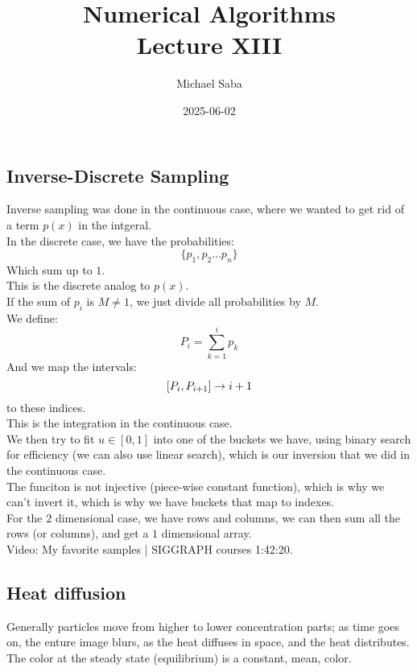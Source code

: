 \documentclass[12pt]{article}
\title{%
    \Huge Numerical Algorithms \\
    \Large Lecture XIII
}
\date{2025-06-02}
\author{Michael Saba}
\begin{document}
\maketitle
\newpage
\setlength{\parindent}{0pt}

\subsection*{Inverse-Discrete Sampling}

Inverse sampling was done in the continuous case,
where we wanted to get rid of a term $p(x)$
in the intgeral. \\

In the discrete case, we have the probabilities:
\[ \{p_1, p_2 \dots p_n \} \]
Which sum up to $1$. \\
This is the discrete analog to $p(x)$. \\

If the sum of $p_i$ is $M \neq 1$, we just divide
all probabilities by $M$. \\

We define:
\[ P_i = \sum_{k=1}^i p_k \]
And we map the intervals:
\[ \left[  P_i,  P_{i+1} \right] \to i+1 \]
to these indices. \\
This is the integration in the continuous case. \\

We then try to fit $u \in [0, 1]$ 
into one of the buckets we have,
using binary search for efficiency
(we can also use linear search), which is our
inversion that we did in the continuous case. \\

The funciton is not injective (piece-wise constant function), 
which is why we can't
invert it, which is why we have buckets that map to
indexes. \\

For the $2$ dimensional case, we have rows and columns,
we can then sum all the rows (or columns),
and get a $1$ dimensional array. \\

Video: My favorite samples | SIGGRAPH courses 1:42:20. \\

\newpage

\subsection*{Heat diffusion}

Generally particles move from higher to lower concentration
parts; as time goes on, the enture image blurs, as
the heat diffuses in space, and the heat distributes. \\
The color at the steady state
(equilibrium) is a constant, mean, color. \\
\end{document}

